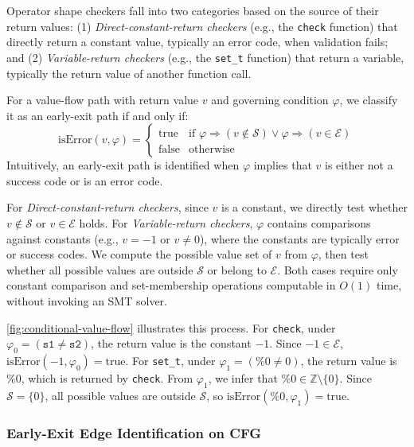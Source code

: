 Operator shape checkers fall into two categories based on the source of their return values:
(1) \textit{Direct-constant-return checkers} (e.g., the \texttt{check} function) that directly return a constant value, typically an error code, when validation fails; and
(2) \textit{Variable-return checkers} (e.g., the \texttt{set\_t} function) that return a variable, typically the return value of another function call.

For a value-flow path with return value $v$ and governing condition $\varphi$, we classify it as an early-exit path if and only if:
\begin{equation}
	\text{isError}(v, \varphi) =
	\begin{cases}
		\text{true} & \text{if } \varphi \Rightarrow (v \notin \mathcal{S}) \lor \varphi \Rightarrow (v \in \mathcal{E}) \\
		\text{false} & \text{otherwise}
	\end{cases}
\end{equation}
Intuitively, an early-exit path is identified when $\varphi$ implies that $v$ is either not a success code or is an error code.

For \textit{Direct-constant-return checkers}, since $v$ is a constant, we directly test whether $v \notin \mathcal{S}$ or $v \in \mathcal{E}$ holds.
For \textit{Variable-return checkers}, $\varphi$ contains comparisons against constants (e.g., $v=-1$ or $v\neq0$), where the constants are typically error or success codes.
We compute the possible value set of $v$ from $\varphi$, then test whether all possible values are outside $\mathcal{S}$ or belong to $\mathcal{E}$.
Both cases require only constant comparison and set-membership operations computable in $O(1)$ time, without invoking an SMT solver.

\autoref{fig:conditional-value-flow} illustrates this process.
For \texttt{check}, under $\varphi_0=(\texttt{s1}\neq\texttt{s2})$, the return value is the constant $-1$.
Since $-1\in\mathcal{E}$, $\text{isError}(-1,\varphi_0)=\text{true}$.
For \texttt{set\_t}, under $\varphi_1=(\%0\neq0)$, the return value is $\%0$, which is returned by \texttt{check}.
From $\varphi_1$, we infer that $\%0\in\mathbb{Z}\setminus\{0\}$.
Since $\mathcal{S}=\{0\}$, all possible values are outside $\mathcal{S}$, so $\text{isError}(\%0,\varphi_1)=\text{true}$.

\subsubsection{Early-Exit Edge Identification on CFG}\label{sec:design:edge-identification}


